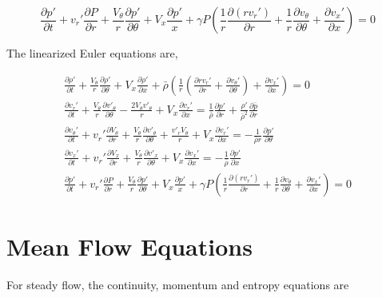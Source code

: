 \documentclass[12pt]{article}
\begin{document}
\begin{equation*}
	\boxed{\frac{\partial p '}{\partial t} + v_r'\frac{\partial P}{\partial r} + \frac{V_{\theta}}{r}\frac{\partial p'}{\partial \theta} + V_x\frac{\partial p'}{x} + \gamma P \left(\frac{1}{r}\frac{\partial (r v_r')}{\partial r} + \frac{1}{r} \frac{\partial v_{\theta}}{\partial \theta} + \frac{\partial v_x'}{\partial x}\right) = 0}
\end{equation*}
\newpage

The linearized Euler equations are,

\begin{align*}
	\frac{\partial \rho'}{\partial t} +
	\frac{V_{\theta}}{r}
	\frac{\partial \rho'}{\partial \theta} + 
	V_x
	\frac{\partial \rho'}{\partial x} +
	\bar{\rho}
	\left(
	\frac{1}{r}
	\left(
	\frac{\partial r v_r'}{\partial r} + \frac{\partial v_{\theta}'}{\partial \theta}		 
	\right) +
	\frac{\partial v_x'}{\partial x}
	\right)= 0\\
	\frac{\partial  v_r' }{\partial t} +
	\frac{V_{\theta}}{r} \frac{\partial v'_{\theta}}{\partial \theta} -
	\frac{2V_{\theta}v'_{\theta}}{r} +
	V_x \frac{\partial v_r'}{\partial x} =\frac{1    }{\bar{\rho}}  \frac{\partial p'}{\partial r} +
	\frac{\rho'}{\bar{\rho}^2}\frac{\partial \bar{p}}{\partial r}\\
	\frac{\partial  v_{\theta}' }{\partial t} +
	v_r' \frac{\partial  V_{\theta}  }{\partial r} +
	\frac{V_{\theta}}{r} \frac{\partial v'_{\theta}}{\partial \theta} +
	\frac{v'_rV_{\theta}}{r} +
	V_x \frac{\partial v_r'}{\partial x} 
	= -\frac{1}{\bar{\rho} r}	\frac{\partial p'}{\partial \theta}\\
	\frac{\partial  v_x' }{\partial t} +
	v_r' \frac{\partial  V_x  }{\partial r} +
	\frac{V_{\theta}}{r} \frac{\partial v'_x}{\partial \theta} +
	V_x \frac{\partial v_x'}{\partial x} 
	= -\frac{1    }{\bar{\rho}}  \frac{\partial p'}{\partial x} \\
	\frac{\partial p '}{\partial t} + v_r'\frac{\partial P}{\partial r} + \frac{V_{\theta}}{r}\frac{\partial p'}{\partial \theta} + V_x\frac{\partial p'}{x} + \gamma P \left(\frac{1}{r}\frac{\partial (r v_r')}{\partial r} + \frac{1}{r} \frac{\partial v_{\theta}}{\partial \theta} + \frac{\partial v_x'}{\partial x}\right) = 0
\end{align*}
\newpage
\section{Mean Flow Equations}

For steady flow, the continuity, momentum and entropy equations are
\end{document}
